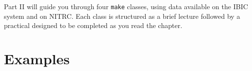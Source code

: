 \documentclass[oneside,11pt]{memoir}
\newcommand\maken{\texttt{make}} %
\begin{document}
	\begin{vplace}[0.7]
		
		\thispagestyle{empty}
		\large
		\noindent Part II will guide you through four \maken{} classes, using data available on the IBIC system and on NITRC. Each class is structured as a brief lecture followed by a practical designed to be completed as you read the chapter.
		
	\end{vplace}
	
	\renewcommand{\chaptername}{Practical}
	\renewcommand{\chapterautorefname}{Practical}
	
	
	
	
	
	\part{Examples}
	\renewcommand{\chaptername}{Example}
	\renewcommand{\chapterautorefname}{Example}
	
	
	
	\appendix
	
%	
	
	
	
	
\end{document}
